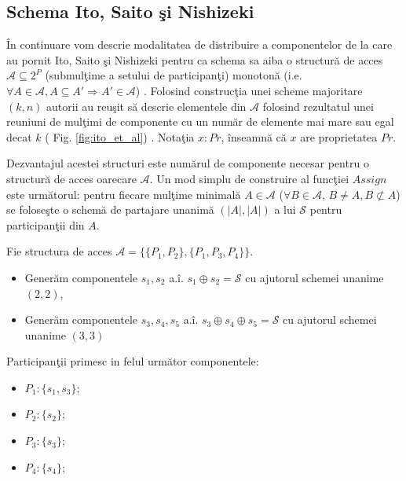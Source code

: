\documentclass{llncs}
\begin{document}

\subsection{Schema Ito, Saito \c{s}i Nishizeki}
\label{Ito}

\^{I}n continuare vom descrie modalitatea de distribuire a componentelor de la care au pornit Ito, Saito \c{s}i Nishizeki pentru ca schema sa aiba o structur\u{a} de acces $\mathcal{A} \subseteq 2^P$ (submul\c{t}ime a setului de participan\c{t}i) monoton\u{a} (i.e. $\forall A \in \mathcal{A}, A \subseteq A' \Rightarrow A' \in \mathcal{A}$) \cite{ITO:1989}. 
Folosind construc\c{t}ia unei scheme majoritare $(k, n)$ autorii au reu\c{s}it s\u{a} descrie elementele din $\mathcal{A}$ folosind rezultatul unei reuniuni de mul\c{t}imi de componente cu un num\u{a}r de elemente mai mare sau egal decat $k$ ( Fig. \ref{fig:ito_et_al}) \cite{ITO:1989}. Nota\c{t}ia $x : Pr$, \^{i}nseamn\u{a} c\u{a} $x$ are proprietatea $Pr$. 

Dezvantajul acestei structuri este num\u{a}rul de componente necesar pentru o structur\u{a} de acces oarecare $\mathcal{A}$. Un mod simplu de construire al func\c{t}iei $Assign$ este urm\u{a}torul: pentru fiecare mul\c{t}ime minimal\u{a} $A \in \mathcal{A}$ ($\forall B \in \mathcal{A}$, $B \neq A, B \not\subset A$) se folose\c{s}te o schem\u{a} de partajare unanim\u{a} $(|A|, |A|)$ a lui $\mathcal{S}$ pentru participan\c{t}ii din $A$.

\begin{example}
	Fie structura de acces $\mathcal{A} = \{ \{P_1, P_2\},\{P_1, P_3, P_4\}\}$.
	\begin{itemize}
		\item Gener\u{a}m componentele $s_1, s_2$ a.\^{i}. $s_1 \oplus s_2 = \mathcal{S}$ cu ajutorul schemei unanime $(2,2)$, 
		\item Gener\u{a}m componentele $s_3, s_4, s_5$ a.\^{i}. $s_3 \oplus s_4 \oplus s_5 = \mathcal{S}$ cu ajutorul schemei unanime $(3,3)$
	\end{itemize}
	Participan\c{t}ii primesc in felul urm\u{a}tor componentele:
	\begin{itemize}
		\item $P_1: \{s_1, s_3\}$;
		\item $P_2: \{s_2\}$;
		\item $P_3: \{s_3\}$;
		\item $P_4: \{s_4\}$;
	\end{itemize}
\end{example}
\end{document}
